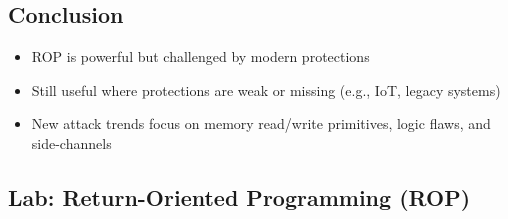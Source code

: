 \subsection{Conclusion}
{
\begin{itemize}[noitemsep]
  \item ROP is powerful but challenged by modern protections
  \item Still useful where protections are weak or missing (e.g., IoT, legacy systems)
  \item New attack trends focus on memory read/write primitives, logic flaws, and side-channels
\end{itemize}
}


\subsection{Lab: Return-Oriented Programming (ROP)}
